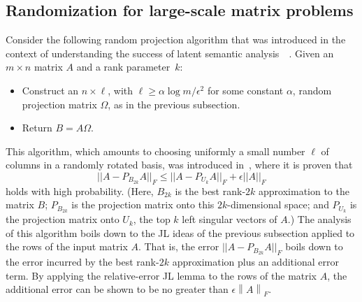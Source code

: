 \documentclass[twoside]{article}
\newcommand{\FNorm }[1]{\mbox{}\left\|#1\right\|_F  }
\begin{document}
\subsection{Randomization for large-scale matrix problems}
\label{sxn:background2:previous}

Consider the following random projection algorithm that was introduced in 
the context of understanding the success of latent semantic 
analysis~~\cite{PRTV00}.
Given an $m \times n$ matrix $A$ and a rank parameter~$k$:
\begin{itemize}
\item
Construct an $n \times \ell$, with $\ell \geq \alpha\log m/\epsilon^2$ for 
some constant $\alpha$, random projection matrix $\Omega$, as in the previous 
subsection.
\item
Return $B=A\Omega$.
\end{itemize}
This algorithm, which amounts to choosing uniformly a small number $\ell$ 
of columns in a randomly rotated basis, was introduced in~\cite{PRTV00}, 
where it is proven that
\begin{equation}
||A-P_{B_{2k}}A||_F \le ||A-P_{U_k}A ||_F + \epsilon ||A||_F
\label{eqn:project-add-err}
\end{equation}
holds with high probability.
(Here, $B_{2k}$ is the best rank-$2k$ approximation to the matrix $B$; 
$P_{B_{2k}}$ is the projection matrix onto this $2k$-dimensional space; and
$P_{U_k}$ is the projection matrix onto $U_k$, the top $k$ left singular 
vectors of $A$.)
The analysis of this algorithm boils down to the JL ideas of the previous 
subsection applied to the rows of the input matrix $A$.
That is, the error $||A-P_{B_{2k}}A||_F$ boils down to the error incurred by
the best rank-$2k$ approximation plus an additional error term.
By applying the relative-error JL lemma to the rows of the matrix $A$, the 
additional error can be shown to be no greater than $\epsilon\FNorm{A}$.
\end{document}
